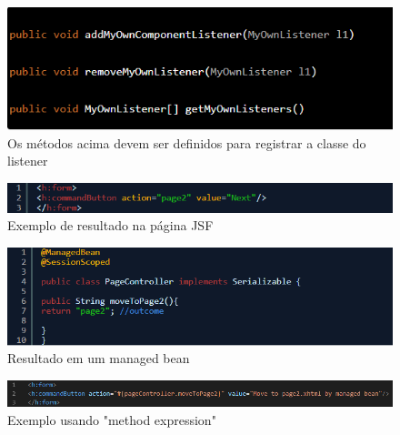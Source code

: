 \documentclass[	DIV=calc,%
							paper=a4,%
							fontsize=12pt,%
							onecolumn]{scrartcl}	 					%
\begin{document}
\begin{figure}
	\centering
	\includegraphics[width=\textwidth]{listener1}
	\caption{Os métodos acima devem ser definidos para registrar a classe do listener}
	\label{fig13}
\end{figure}


\begin{figure}
	\centering
	\includegraphics[width=\textwidth]{navigation1}
	\caption{Exemplo de resultado na página JSF}
	\label{fig14}
\end{figure}


\begin{figure}
	\centering
	\includegraphics[width=\textwidth]{navigation2}
	\caption{Resultado em um managed bean}
	\label{fig15}
\end{figure}


\begin{figure}
	\centering
	\includegraphics[width=\textwidth]{navigation3}
	\caption{Exemplo usando "method expression"}
	\label{fig16}
\end{figure}
\end{document}
